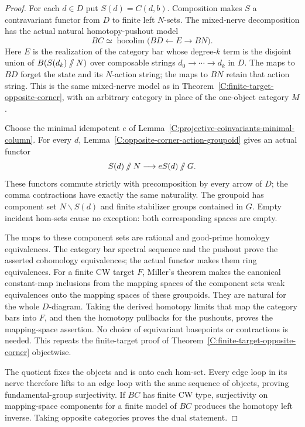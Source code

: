 \begin{proof}
For each $d\in D$ put $S(d)=C(d,b)$. Composition makes $S$ a
contravariant functor from $D$ to finite left $N$-sets. The
mixed-nerve decomposition has the actual natural homotopy-pushout
model
\[
 BC\simeq\operatorname{hocolim}
       \bigl(BD\longleftarrow E\longrightarrow BN\bigr).
\]
Here $E$ is the realization of the category bar whose degree-$k$
term is the disjoint union of $B(S(d_k)\mathbin{/\mkern-6mu/}N)$
over composable strings $d_0\to\cdots\to d_k$ in $D$.
The maps to $BD$ forget the state and its $N$-action string;
the maps to $BN$ retain that action string. This is the same
mixed-nerve model as in
Theorem~\ref{C:finite-target-opposite-corner}, with an arbitrary
category in place of the one-object category $M$.

Choose the minimal idempotent $e$ of
Lemma~\ref{C:projective-coinvariants-minimal-column}.
For every $d$, Lemma~\ref{C:opposite-corner-action-groupoid}
gives an actual functor
\[
 S(d)\mathbin{/\mkern-6mu/}N
   \longrightarrow eS(d)\mathbin{/\mkern-6mu/}G.
\]
These functors commute strictly with precomposition by every arrow
of $D$; the comma contractions have exactly the same naturality.
The groupoid has component set $N\backslash S(d)$ and finite
stabilizer groups contained in $G$. Empty incident hom-sets cause
no exception: both corresponding spaces are empty.

The maps to these component sets are rational and good-prime
homology equivalences. The category bar spectral sequence and the
pushout prove the asserted cohomology equivalences; the actual
functor makes them ring equivalences.
For a finite CW target $F$, Miller's theorem makes the canonical
constant-map inclusions from the mapping spaces of the component
sets weak equivalences onto the mapping spaces of these groupoids.
They are natural for the whole $D$-diagram. Taking the derived
homotopy limits that map the category bars into $F$, and then the
homotopy pullbacks for the pushouts, proves the mapping-space
assertion. No choice of equivariant basepoints or contractions is
needed. This repeats the finite-target proof of
Theorem~\ref{C:finite-target-opposite-corner} objectwise.

The quotient fixes the objects and is onto each hom-set. Every
edge loop in its nerve therefore lifts to an edge loop with the
same sequence of objects, proving fundamental-group surjectivity.
If $BC$ has finite CW type, surjectivity on mapping-space components
for a finite model of $BC$ produces the homotopy left inverse.
Taking opposite categories proves the dual statement.
\end{proof}

